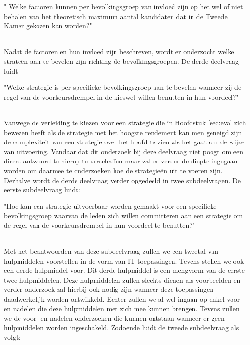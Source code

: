 \begin{DV}" Welke factoren kunnen per bevolkingsgroep van invloed zijn op het wel of niet behalen van het theoretisch maximum aantal kandidaten dat in de Tweede Kamer gekozen kan worden?"\\\
\end{DV}

Nadat de factoren en hun invloed zijn beschreven, wordt er onderzocht welke strate\"{e}n aan te bevelen zijn richting de bevolkingsgroepen. De derde deelvraag luidt:\\

\begin{DV}"Welke strategie is per specifieke bevolkingsgroep aan te bevelen wanneer zij de regel van de voorkeursdrempel in de kieswet willen benutten in hun voordeel?"\\\
\end{DV}

Vanwege de verleiding te kiezen voor een strategie die in Hoofdstuk \ref{sec:eva} zich bewezen heeft als de strategie met het hoogste rendement kan men geneigd zijn de complexiteit van een strategie over het hoofd te zien als het gaat om de wijze van uitvoering. Vandaar dat dit onderzoek bij deze deelvraag niet poogt om een direct antwoord te hierop te verschaffen maar zal er verder de diepte ingegaan worden om daarmee te onderzoeken hoe de strategie\"{e}n uit te voeren zijn. Derhalve wordt de derde deelvraag verder opgedeeld in twee subdeelvragen. De eerste subdeelvraag luidt:\\

\begin{SDV}"Hoe kan een strategie uitvoerbaar worden gemaakt voor een specifieke bevolkingsgroep waarvan de leden zich willen committeren aan een strategie om de regel van de voorkeursdrempel in hun voordeel te benutten?"\\\
\end{SDV}

Met het beantwoorden van deze subdeelvraag zullen we een tweetal van hulpmiddelen voorstellen in de vorm van IT-toepassingen. Tevens stellen we ook een derde hulpmiddel voor. Dit derde hulpmiddel is een mengvorm van de eerste twee hulpmiddelen. Deze hulpmiddelen zullen slechts dienen als voorbeelden en verder onderzoek zal hierbij ook nodig zijn wanneer deze toepassingen daadwerkelijk worden ontwikkeld. Echter zullen we al wel ingaan op enkel voor- en nadelen die deze hulpmiddelen met zich mee kunnen brengen. Tevens zullen we de voor- en nadelen onderzoeken die kunnen ontstaan wanneer er geen hulpmiddelen worden ingeschakeld. Zodoende luidt de tweede subdeelvraag als volgt: \\\

